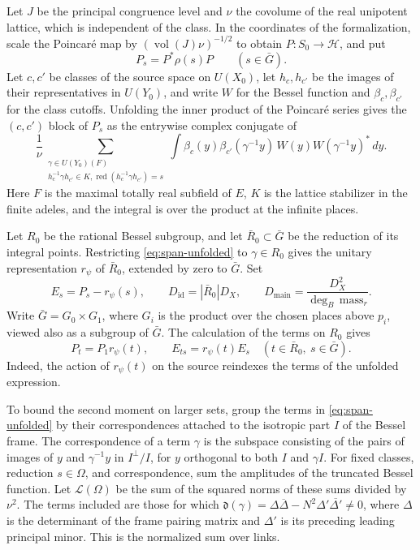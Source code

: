Let \(J\) be the principal congruence level and \(\nu\) the covolume of the
real unipotent lattice, which is independent of the class. In the coordinates
of the formalization, scale the Poincar\'e map by \((\operatorname{vol}(J)\nu)^{-1/2}\)
to obtain \(P\colon S_0\to\mathcal H\), and put
\[
 P_s=P^*\rho(s)P \qquad(s\in\bar G).
\]
Let \(c,c'\) be classes of the source space on \(U(X_0)\), let \(h_c,h_{c'}\)
be the images of their representatives in \(U(Y_0)\), and write \(W\) for the
Bessel function and \(\beta_c,\beta_{c'}\) for the class cutoffs. Unfolding the
inner product of the Poincar\'e series gives the \((c,c')\) block of \(P_s\)
as the entrywise complex conjugate of
\begin{equation}\label{eq:span-unfolded}
 \frac1\nu
 \sum_{\substack{\gamma\in U(Y_0)(F)\\
       h_c^{-1}\gamma h_{c'}\in K,\!
       \operatorname{red}(h_c^{-1}\gamma h_{c'})=s}}
 \int
    \beta_c(y)\beta_{c'}(\gamma^{-1}y)\,
    W(y)W(\gamma^{-1}y)^*\,dy .
\end{equation}
Here \(F\) is the maximal totally real subfield of \(E\), \(K\) is the lattice
stabilizer in the finite adeles, and the integral is over the product at the
infinite places.

Let \(R_0\) be the rational Bessel subgroup, and let \(\bar R_0\subset\bar G\)
be the reduction of its integral points. Restricting
\eqref{eq:span-unfolded} to \(\gamma\in R_0\) gives the unitary representation
\(r_\psi\) of \(\bar R_0\), extended by zero to \(\bar G\). Set
\[
  E_s=P_s-r_\psi(s),\qquad
  D_{\mathrm{id}}=|\bar R_0|D_X,\qquad
  D_{\mathrm{main}}=\frac{D_X^2}{\deg_B\,\mathrm{mass}_r}.
\]
Write \(\bar G=G_0\times G_1\), where \(G_i\) is the product over the chosen
places above \(p_i\), viewed also as a subgroup of \(\bar G\).
The calculation of the terms on \(R_0\) gives
\begin{equation}\label{eq:span-equivariance}
 P_t=P_1r_\psi(t),\qquad E_{ts}=r_\psi(t)E_s
 \quad(t\in\bar R_0,\ s\in\bar G).
\end{equation}
Indeed, the action of \(r_\psi(t)\) on the source reindexes the terms of
the unfolded expression.

To bound the second moment on larger sets, group the terms in
\eqref{eq:span-unfolded} by their correspondences attached to the isotropic
part \(I\) of the Bessel frame. The correspondence of a term \(\gamma\) is
the subspace consisting of the pairs of images of \(y\) and \(\gamma^{-1}y\)
in \(I^\perp/I\), for \(y\) orthogonal to both \(I\) and \(\gamma I\).
For fixed classes, reduction \(s\in\Omega\), and correspondence, sum the
amplitudes of the truncated Bessel function. Let \(\mathcal L(\Omega)\) be
the sum of the squared norms of these sums divided by \(\nu^2\).
The terms included are those for which
\(\mathfrak d(\gamma)=\Delta\overline{\Delta}-N^2\Delta'\overline{\Delta'}\ne0\),
where \(\Delta\) is the determinant of the frame pairing matrix and
\(\Delta'\) is its preceding leading principal minor.
This is the normalized sum over links.

